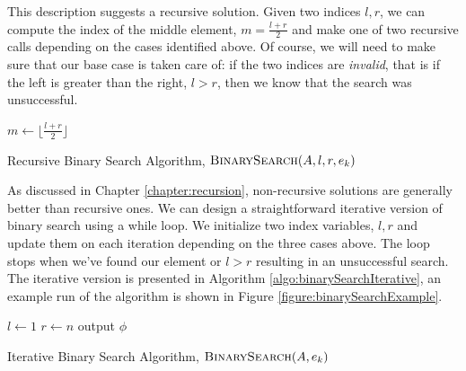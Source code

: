 This description suggests a recursive solution.  Given two indices
$l, r$, we can compute the index of the middle element, $m = \frac{l + r}{2}$
and make one of two recursive calls depending on the cases identified
above.  Of course, we will need to make sure that our base case is taken
care of: if the two indices are \emph{invalid}, that is if the left
is greater than the right, $l > r$, then we know that the search
was unsuccessful.

\begin{algorithm}[H]
  $m \leftarrow \lfloor \frac{l + r}{2} \rfloor$ \;
\caption{Recursive Binary Search Algorithm, $\textsc{BinarySearch}(A, l, r, e_k)$}
\label{algo:binarySearchRecursive}
\end{algorithm}

As discussed in Chapter \ref{chapter:recursion}, non-recursive solutions
are generally better than recursive ones.  We can design a straightforward
iterative version of binary search using a while loop.  We initialize two
index variables, $l, r$ and update them on each iteration depending on the
three cases above.  The loop stops when we've found our element or $l > r$
resulting in an unsuccessful search.  The iterative version is presented
in Algorithm \ref{algo:binarySearchIterative}, an example run of the
algorithm is shown in Figure \ref{figure:binarySearchExample}.

\begin{algorithm}[H]
  $l \leftarrow 1$ \;
  $r \leftarrow n$ \;
  output $\phi$ \;
\caption{Iterative Binary Search Algorithm, $\textsc{BinarySearch}(A, e_k)$}
\label{algo:binarySearchIterative}
\end{algorithm}

